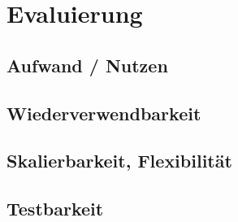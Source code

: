 \chapter{Evaluierung}

\section{Aufwand / Nutzen}

\section{Wiederverwendbarkeit}

\section{Skalierbarkeit, Flexibilität}

\section{Testbarkeit}